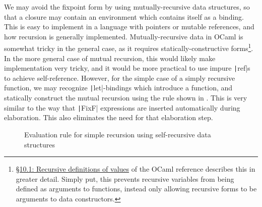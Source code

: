 We may avoid the fixpoint form by using mutually-recursive data structures, so that a closure may contain an environment which contains itself as a binding. This is easy to implement in a language with pointers or mutable references, and how recursion is generally implemented. Mutually-recursive data in OCaml is somewhat tricky in the general case, as it requires statically-constructive forms\footnote{\href{https://ocaml.org/manual/letrecvalues.html}{\S10.1: Recursive definitions of values} of the OCaml reference describes this in greater detail. Simply put, this prevents recursive variables from being defined as arguments to functions, instead only allowing recursive forms to be arguments to data constructors.}. In the more general case of mutual recursion, this would likely make implementation very tricky, and it would be more practical to use impure \texttt|ref|s to achieve self-reference. However, for the simple case of a simply recursive function, we may recognize \texttt|let|-bindings which introduce a function, and statically construct the mutual recursion using the rule shown in . This is very similar to the way that \texttt|FixF| expressions are inserted automatically during elaboration. This also eliminates the need for that elaboration step.


\begin{figure}
  \centering
  \begin{singlespace}
    \begin{mathpar}
    \end{mathpar}
  \end{singlespace}
  \caption{Evaluation rule for simple recursion using self-recursive data structures}
  \label{fig:rec-closures-let}
\end{figure}



